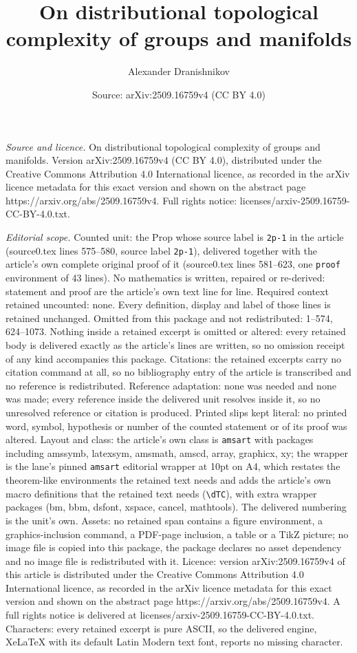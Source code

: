 \documentclass[10pt,a4paper]{amsart}
\title[On distributional topological complexity of groups and manif]{On distributional topological complexity of groups and manifolds}
\author{Alexander Dranishnikov}
\date{Source: arXiv:2509.16759v4 (CC BY 4.0)}
\begin{document}
\maketitle

\noindent\emph{Source and licence.} On distributional topological complexity of groups and manifolds. Version arXiv:2509.16759v4 (CC BY 4.0), distributed under the Creative Commons Attribution 4.0 International licence, as recorded in the arXiv licence metadata for this exact version and shown on the abstract page https://arxiv.org/abs/2509.16759v4. Full rights notice: licenses/arxiv-2509.16759-CC-BY-4.0.txt.\par\smallskip

\noindent\textit{Editorial scope.} Counted unit: the Prop whose source label is \texttt{2p-1} in the article (source0.tex lines 575--580, source label \texttt{2p-1}), delivered together with the article's own complete original proof of it (source0.tex lines 581--623, one \texttt{proof} environment of 43 lines). No mathematics is written, repaired or re-derived: statement and proof are the article's own text line for line. Required context retained uncounted: none. Every definition, display and label of those lines is retained unchanged. Omitted from this package and not redistributed: 1--574, 624--1073. Nothing inside a retained excerpt is omitted or altered: every retained body is delivered exactly as the article's lines are written, so no omission receipt of any kind accompanies this package. Citations: the retained excerpts carry no citation command at all, so no bibliography entry of the article is transcribed and no reference is redistributed. Reference adaptation: none was needed and none was made; every reference inside the delivered unit resolves inside it, so no unresolved reference or citation is produced. Printed slips kept literal: no printed word, symbol, hypothesis or number of the counted statement or of its proof was altered. Layout and class: the article's own class is \texttt{amsart} with packages including amssymb, latexsym, amsmath, amscd, array, graphicx, xy; the wrapper is the lane's pinned \texttt{amsart} editorial wrapper at 10pt on A4, which restates the theorem-like environments the retained text needs and adds the article's own macro definitions that the retained text needs (\texttt{\textbackslash dTC}), with extra wrapper packages (bm, bbm, dsfont, xspace, cancel, mathtools). The delivered numbering is the unit's own. Assets: no retained span contains a figure environment, a graphics-inclusion command, a PDF-page inclusion, a table or a TikZ picture; no image file is copied into this package, the package declares no asset dependency and no image file is redistributed with it. Licence: version arXiv:2509.16759v4 of this article is distributed under the Creative Commons Attribution 4.0 International licence, as recorded in the arXiv licence metadata for this exact version and shown on the abstract page https://arxiv.org/abs/2509.16759v4. A full rights notice is delivered at licenses/arxiv-2509.16759-CC-BY-4.0.txt. Characters: every retained excerpt is pure ASCII, so the delivered engine, XeLaTeX with its default Latin Modern text font, reports no missing character.
\end{document}
